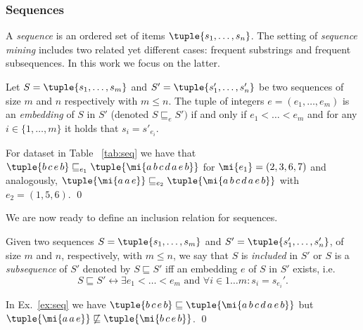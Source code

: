 \subsubsection{Sequences} A \emph{sequence} is an ordered set of items $\tuple{s_1,\dotsc,s_n}$.
The setting of \emph{sequence mining} includes two related yet different cases: frequent substrings 
and frequent subsequences. In this work we focus on the latter. 


\begin{definition}\label{def:embseq}
Let $S=\tuple{s_1,\dotsc,s_m}$ and $S'=\tuple{s_1',\dotsc,s_n'}$ be  two  sequences  of  size $m$ and $n$ respectively  with $m \leq n$.  The  tuple  of  integers $e=(e_1,\dotsc,e_m)$ is an \emph{embedding} of $S$ in $S'$ (denoted $S\sqsubseteq_e S')$ if and only if $e_1< \dotsc < e_m$ and for any $i \in \{1,\ldots,m\}$ it holds that $s_i=s'_{e_i}$.
\end{definition}


\begin{example}\label{ex:seq}
	For  dataset in Table ~\ref{tab:seq} we have that $\tuple{b\,c\,e\,b} \sqsubseteq_{e_1} \tuple{\mi{a\,b\,c\,d\,a\,e\,b}}$ for $\mi{e_1}=(2,3,6,7)$ and analogously, $\tuple{\mi{a\,a\,e}}\sqsubseteq_{e_2} \tuple{\mi{a\,b\,c\,d\,a\,e\,b}}$ with $e_2=(1,5,6)$. \qed
\end{example}

We are now ready to define an inclusion relation for sequences. 

\begin{definition}\label{def:seqinc}
Given two sequences $S = \tuple{s_1,\dotsc, s_m}$ and $S'=\tuple{s_1',\dotsc, s_n'}$, of %
size $m$ and $n$, respectively, with $m \leq n$, we say that $S$ is \emph{included} in $S'$ or $S$ is a \emph{subsequence} of $S'$ denoted by $S \sqsubseteq S'$ iff an embedding $e$ of $S$ in $S'$ exists, i.e.
\begin{equation}
S \sqsubseteq S' \leftrightarrow \exists e_1<\dotsc<e_m \text{ and }\forall i \in 1\dotsc m: s_i=s_{e_i}'.
\end{equation}
\end{definition}

\begin{example}
  In Ex.~\ref{ex:seq} we have  $\tuple{b\,c\,e\,b} \sqsubseteq \tuple{\mi{a\,b\,c\,d\,a\,e\,b}}$ but  $\tuple{\mi{a\,a\,e}} \not \sqsubseteq \tuple{\mi{b\, c\, e\, b}}$. \qed
\end{example}


